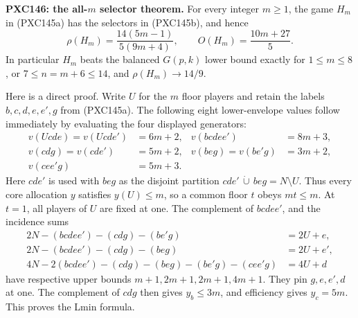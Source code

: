 \documentclass[11pt]{article}
\begin{document}
\medskip
\noindent\textbf{PXC146: the all-\(m\) selector theorem.}
For every integer \(m\ge1\), the game \(H_m\) in (PXC145a) has the selectors
in (PXC145b), and hence
\begin{equation}
 \rho(H_m)=\frac{14(5m-1)}{5(9m+4)},\qquad
 O(H_m)=\frac{10m+27}{5}.                              \tag{PXC146a}
\end{equation}
In particular \(H_m\) beats the balanced \(G(p,k)\) lower bound exactly for
\(1\le m\le8\), or \(7\le n=m+6\le14\), and
\(\rho(H_m)\to14/9\).

Here is a direct proof.  Write \(U\) for the \(m\) floor players and retain
the labels \(b,c,d,e,e',g\) from (PXC145a).  The following eight
lower-envelope values follow immediately by evaluating the four displayed
generators:
\begin{align*}
 v(Ucde)=v(Ucde')&=6m+2,&v(bcdee')&=8m+3,\\
 v(cdg)=v(cde')&=5m+2,&v(beg)=v(be'g)&=3m+2,\\
 v(cee'g)&=5m+3.&&
\end{align*}
Here \(cde'\) is used with \(beg\) as the disjoint partition
\(cde'\,\dot\cup\,beg=N\setminus U\).  Thus every core allocation \(y\)
satisfies \(y(U)\le m\), so a common floor \(t\) obeys \(mt\le m\).
At \(t=1\), all players of \(U\) are fixed at one.  The complement of
\(bcdee'\), and the incidence sums
\begin{align*}
2N-(bcdee')-(cdg)-(be'g)&=2U+e,\\
2N-(bcdee')-(cdg)-(beg)&=2U+e',\\
4N-2(bcdee')-(cdg)-(beg)-(be'g)-(cee'g)&=4U+d
\end{align*}
have respective upper bounds \(m+1,2m+1,2m+1,4m+1\).
They pin \(g,e,e',d\) at one.  The complement of \(cdg\) then gives
\(y_b\le3m\), and efficiency gives \(y_c=5m\).  This proves the Lmin
formula.
\end{document}
